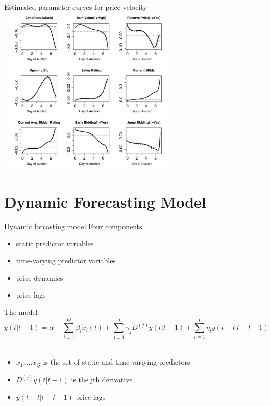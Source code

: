 \documentclass[hyperref={pdfpagelabels=false}]{beamer}
\begin{document}
\begin{frame}{Estimated parameter curves for price velocity}
\center
\includegraphics[width=0.65\textwidth]{price_velocity}
\end{frame} 


\section{Dynamic Forecasting Model}

\begin{frame}{Dynamic forcasting model}
Four components
\begin{itemize}
    \item static predictor variables
    \item time-varying predictor variables
    \item price dynamics
    \item price lags
\end{itemize}    
\end{frame}

\begin{frame}{The model}
\begin{equation}
y(t|t-1)=\alpha+\sum_{i=1}^{Q}\beta_ix_i(t)+\sum_{j=1}^J\gamma_jD^{(j)}y(t|t-1)+\sum_{l=1}^L\eta_ly(t-l|t-l-1) \nonumber
\end{equation}
\newline \\
\begin{itemize}
    \item $x_1,...x_Q$ is the set of static and time variying predictors
    \item $D^{(j)}y(t|t-1)$ is the jth derivative
    \item $y(t-l|t-l-1)$ price lags
\end{itemize}
\end{frame}
\end{document}
